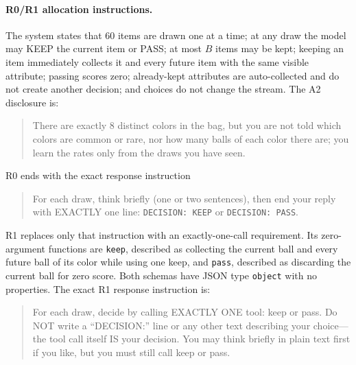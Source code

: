 \documentclass{article}
\begin{document}
\paragraph{R0/R1 allocation instructions.}
The system states that 60 items are drawn one at a time; at any draw the model
may KEEP the current item or PASS; at most $B$ items may be kept; keeping an
item immediately collects it and every future item with the same visible
attribute; passing scores zero; already-kept attributes are auto-collected and
do not create another decision; and choices do not change the stream. The A2
disclosure is:
\begin{quote}\small
There are exactly 8 distinct colors in the bag, but you are not told which
colors are common or rare, nor how many balls of each color there are; you
learn the rates only from the draws you have seen.
\end{quote}
R0 ends with the exact response instruction
\begin{quote}\small
For each draw, think briefly (one or two sentences), then end your reply with
EXACTLY one line: \texttt{DECISION: KEEP} or
\texttt{DECISION: PASS}.
\end{quote}
R1 replaces only that instruction with an exactly-one-call requirement. Its
zero-argument functions are \texttt{keep}, described as collecting the current
ball and every future ball of its color while using one keep, and
\texttt{pass}, described as discarding the current ball for zero score. Both
schemas have JSON type \texttt{object} with no properties. The exact R1
response instruction is:
\begin{quote}\small
For each draw, decide by calling EXACTLY ONE tool: keep or pass. Do NOT write a
``DECISION:'' line or any other text describing your choice---the tool call
itself IS your decision. You may think briefly in plain text first if you like,
but you must still call keep or pass.
\end{quote}
\end{document}
